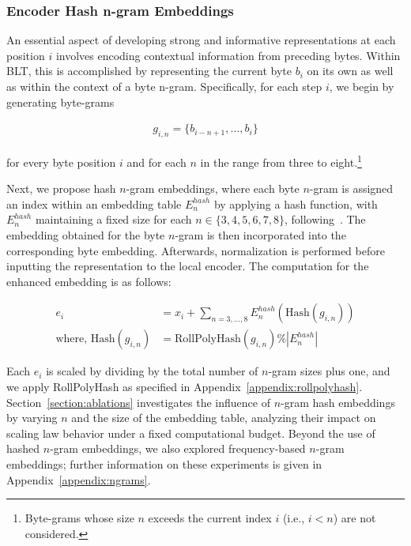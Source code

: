 \subsubsection{Encoder Hash n-gram Embeddings}
\label{sec:ngram-emb}
\label{sec:hash-emb}
An essential aspect of developing strong and informative representations at each position $i$ involves encoding contextual information from preceding bytes. Within {\textsc BLT}, this is accomplished by representing the current byte $b_i$ on its own as well as within the context of a byte n-gram. Specifically, for each step $i$, we begin by generating byte-grams

\begin{align}
    g_{i,n}=\{b_{i-n + 1},\ldots, b_i\}
\end{align}

for every byte position $i$ and for each $n$ in the range from three to eight.\footnote{
Byte-grams whose size $n$ exceeds the current index $i$ (i.e., $i < n$) are not considered.
}

Next, we propose hash $n$-gram embeddings, where each byte $n$-gram is assigned an index within an embedding table $E_{n}^{hash}$ by applying a hash function, with $E_{n}^{hash}$ maintaining a fixed size for each $n \in \{3,4,5,6,7,8\}$, following~\citep{bai2010learning}. 
The embedding obtained for the byte $n$-gram is then incorporated into the corresponding byte embedding. Afterwards, normalization is performed before inputting the representation to the local encoder. The computation for the enhanced embedding is as follows:

\begin{align}
e_i &= x_i + \sum_{n = 3,...,8}E_{n}^{hash}(\text{Hash}(g_{i,n})) \\
\text{where, Hash}(g_{i,n}) &= \text{RollPolyHash}(g_{i,n}) \% |E_{n}^{hash}|
\end{align}

Each $e_i$ is scaled by dividing by the total number of $n$-gram sizes plus one, and we apply RollPolyHash as specified in Appendix~\ref{appendix:rollpolyhash}. Section~\ref{section:ablations} investigates the influence of $n$-gram hash embeddings by varying $n$ and the size of the embedding table, analyzing their impact on scaling law behavior under a fixed computational budget. Beyond the use of hashed $n$-gram embeddings, we also explored frequency-based $n$-gram embeddings; further information on these experiments is given in Appendix~\ref{appendix:ngrams}.

